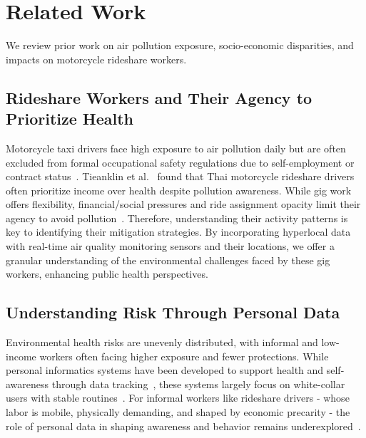 \section{Related Work}
We review prior work on air pollution exposure, socio-economic disparities, and impacts on motorcycle rideshare workers.

\subsection{Rideshare Workers and Their Agency to Prioritize Health}



Motorcycle taxi drivers face high exposure to air pollution daily but are often excluded from formal occupational safety regulations due to self-employment or contract status~\cite{slater2022air}. 
Tieanklin et al.~\cite{tieanklin2024rideshare} found that Thai motorcycle rideshare drivers often prioritize income over health despite pollution awareness.
While gig work offers flexibility, financial/social pressures and ride assignment opacity limit their agency to avoid pollution~\cite{machado2021midlife,elfassy2019associations}.
Therefore, understanding their activity patterns is key to identifying their mitigation strategies. 
By incorporating hyperlocal data with real-time air quality monitoring sensors and their locations, we offer a granular understanding of the environmental challenges faced by these gig workers, enhancing public health perspectives.





\subsection{Understanding Risk Through Personal Data}

Environmental health risks are unevenly distributed, with informal and low-income workers often facing higher exposure and fewer protections. 
While personal informatics systems have been developed to support health and self-awareness through data tracking~\cite{li2010stage}, these systems largely focus on white-collar users with stable routines~\cite{epstein2020}. 
For informal workers like rideshare drivers - whose labor is mobile, physically demanding, and shaped by economic precarity - the role of personal data in shaping awareness and behavior remains underexplored~\cite{slater2022air}.

